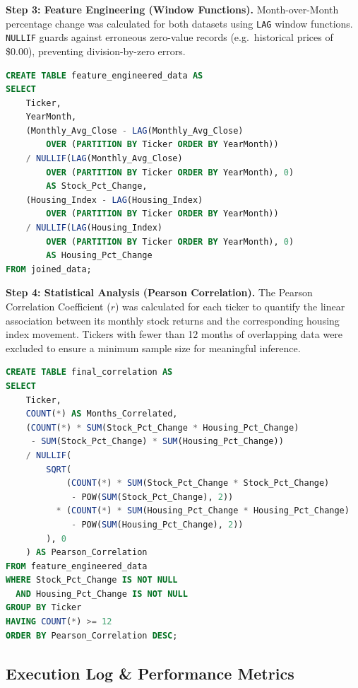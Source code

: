 \documentclass[11pt]{article}
\begin{document}
\textbf{Step 3: Feature Engineering (Window Functions).}
Month-over-Month percentage change was calculated for both datasets using \texttt{LAG} window functions. \texttt{NULLIF} guards against erroneous zero-value records (e.g.\ historical prices of \$0.00), preventing division-by-zero errors.

\begin{lstlisting}[language=SQL]
CREATE TABLE feature_engineered_data AS
SELECT
    Ticker,
    YearMonth,
    (Monthly_Avg_Close - LAG(Monthly_Avg_Close)
        OVER (PARTITION BY Ticker ORDER BY YearMonth))
    / NULLIF(LAG(Monthly_Avg_Close)
        OVER (PARTITION BY Ticker ORDER BY YearMonth), 0)
        AS Stock_Pct_Change,
    (Housing_Index - LAG(Housing_Index)
        OVER (PARTITION BY Ticker ORDER BY YearMonth))
    / NULLIF(LAG(Housing_Index)
        OVER (PARTITION BY Ticker ORDER BY YearMonth), 0)
        AS Housing_Pct_Change
FROM joined_data;
\end{lstlisting}

\textbf{Step 4: Statistical Analysis (Pearson Correlation).}
The Pearson Correlation Coefficient ($r$) was calculated for each ticker to quantify the linear association between its monthly stock returns and the corresponding housing index movement. Tickers with fewer than 12 months of overlapping data were excluded to ensure a minimum sample size for meaningful inference.

\begin{lstlisting}[language=SQL]
CREATE TABLE final_correlation AS
SELECT
    Ticker,
    COUNT(*) AS Months_Correlated,
    (COUNT(*) * SUM(Stock_Pct_Change * Housing_Pct_Change)
     - SUM(Stock_Pct_Change) * SUM(Housing_Pct_Change))
    / NULLIF(
        SQRT(
            (COUNT(*) * SUM(Stock_Pct_Change * Stock_Pct_Change)
             - POW(SUM(Stock_Pct_Change), 2))
          * (COUNT(*) * SUM(Housing_Pct_Change * Housing_Pct_Change)
             - POW(SUM(Housing_Pct_Change), 2))
        ), 0
    ) AS Pearson_Correlation
FROM feature_engineered_data
WHERE Stock_Pct_Change IS NOT NULL
  AND Housing_Pct_Change IS NOT NULL
GROUP BY Ticker
HAVING COUNT(*) >= 12
ORDER BY Pearson_Correlation DESC;
\end{lstlisting}

\subsection{Execution Log \& Performance Metrics}
\end{document}
